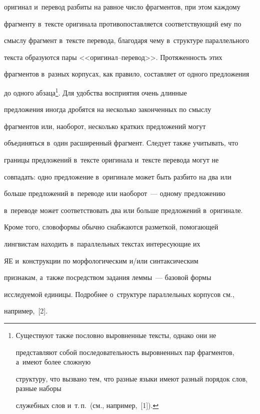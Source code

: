 оригинал и~перевод разбиты на равное чис\-ло фраг\-мен\-тов, при этом каждому 


фраг\-мен\-ту в~текс\-те оригинала противопоставляется со\-от\-вет\-ст\-ву\-ющий ему по 


смыс\-лу фрагмент в~текс\-те перевода, благодаря чему в~структуре параллельного 


текс\-та образуются пары <<ори\-ги\-нал--пе\-ре\-вод>>. Про\-тя\-жен\-ность этих 


фраг\-мен\-тов в~раз\-ных корпусах, как правило, составляет от одного предложения 


до одного абзаца\footnote{Существуют также пословно выровненные тексты, однако они не 


представляют собой последовательность выровненных пар фрагментов, а~имеют более слож\-ную 


структуру, что вызвано тем, что разные языки имеют разный порядок слов, разные наборы 


служебных слов и~т.\,п.\ (см., например,~[1]).}. Для удобства восприятия очень длинные 


предложения иногда дробятся на несколько законченных по смыс\-лу 


фрагментов или, наоборот, несколько кратких предложений могут 


объединяться в~один расширенный фрагмент. Следует также учитывать, что 


границы предложений в~текс\-те оригинала и~текс\-те перевода могут не 


совпадать: одно предложение в~оригинале может быть разбито на два или 


больше предложений в~переводе или наоборот~--- одному предложению 


в~переводе может соответствовать два или больше предложений в~оригинале. 


   


   Кроме того, словоформы обычно снабжаются разметкой, помогающей 


лингвистам находить в~параллельных текс\-тах ин\-те\-ре\-су\-ющие их 


ЯЕ и~конструкции по морфологическим и\!/\!или синтаксическим 


приз\-на\-кам, а~так\-же посредством задания леммы~--- базовой формы 


ис\-сле\-ду\-емой единицы. По\-дроб\-нее о~структуре параллельных корпусов см., 


например,~[2].


